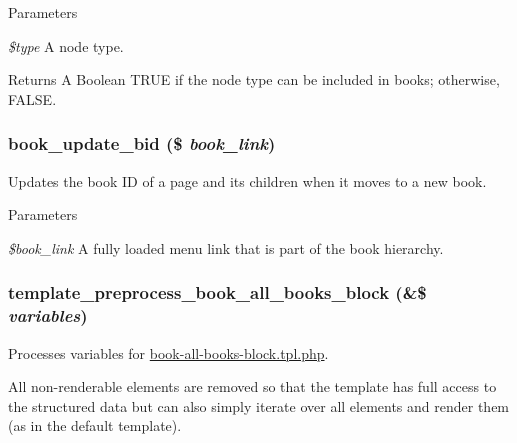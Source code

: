 \begin{DoxyParams}{Parameters}
\item[{\em \$type}]A node type.\end{DoxyParams}
\begin{DoxyReturn}{Returns}
A Boolean TRUE if the node type can be included in books; otherwise, FALSE. 
\end{DoxyReturn}
\hypertarget{book_8module_a0e4082bcf6978b609bbcd7a4adc14aba}{
\subsubsection[{book\_\-update\_\-bid}]{\setlength{\rightskip}{0pt plus 5cm}book\_\-update\_\-bid (\$ {\em book\_\-link})}}
\label{book_8module_a0e4082bcf6978b609bbcd7a4adc14aba}
Updates the book ID of a page and its children when it moves to a new book.


\begin{DoxyParams}{Parameters}
\item[{\em \$book\_\-link}]A fully loaded menu link that is part of the book hierarchy. \end{DoxyParams}
\hypertarget{book_8module_a57d4d9c4e795c96dc9828781404fc577}{
\subsubsection[{template\_\-preprocess\_\-book\_\-all\_\-books\_\-block}]{\setlength{\rightskip}{0pt plus 5cm}template\_\-preprocess\_\-book\_\-all\_\-books\_\-block (\&\$ {\em variables})}}
\label{book_8module_a57d4d9c4e795c96dc9828781404fc577}
Processes variables for \hyperlink{book-all-books-block_8tpl_8php}{book-\/all-\/books-\/block.tpl.php}.

All non-\/renderable elements are removed so that the template has full access to the structured data but can also simply iterate over all elements and render them (as in the default template).


